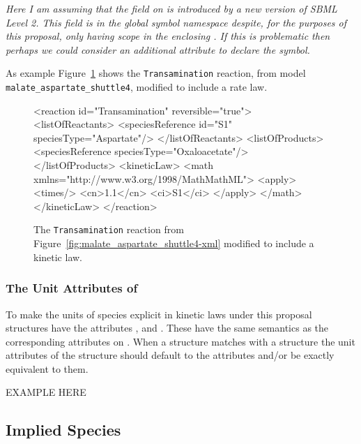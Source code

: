 \documentclass{cekarticle}
\begin{document}
\emph{Here I am assuming that the  field on  is introduced by a
new version of SBML Level 2. This  field is in the global symbol
namespace despite, for the purposes of this proposal, only having scope in the enclosing
.  If this is problematic then perhaps we could consider an additional attribute to
declare the symbol.}

As example Figure~\ref{fig:Transamination-xml} shows the \texttt{Transamination} reaction, from model
\texttt{malate\_aspartate\_shuttle4}, modified to include a rate law.

\begin{figure}[h]
\begin{example}
<reaction id="Transamination" reversible="true">
    <listOfReactants>
        <speciesReference id="S1" speciesType="Aspartate"/>
    </listOfReactants>
    <listOfProducts>
        <speciesReference speciesType="Oxaloacetate"/>
    </listOfProducts>
    <kineticLaw>
        <math xmlns="http://www.w3.org/1998/MathMathML">
            <apply>
                <times/>
                <cn>1.1</cn>
                <ci>S1</ci>
            </apply> 
        </math>
    </kineticLaw>
</reaction>
\end{example}
\caption{The \texttt{Transamination} reaction from
Figure~\ref{fig:malate_aspartate_shuttle4-xml} modified to include a kinetic law.} 
\label{fig:Transamination-xml}
\end{figure}

\subsubsection{The Unit Attributes of }

To make the units of species explicit in kinetic laws under this proposal 
 structures have the attributes ,
 and .  These have the same semantics as
the corresponding attributes on .  
When a  structure matches with a  structure
the unit attributes of the  structure should default to the
 attributes and/or be exactly equivalent to them.  

EXAMPLE HERE

\subsection{Implied Species}
\end{document}

